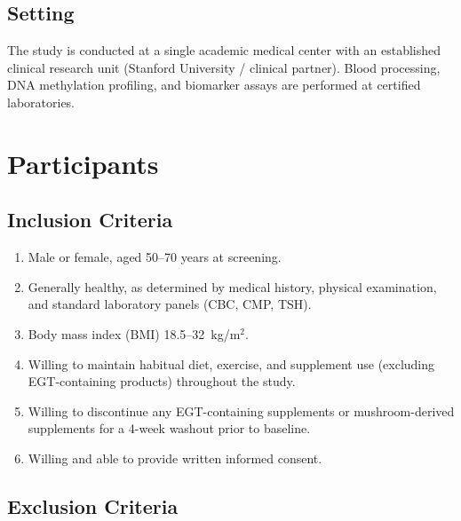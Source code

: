 \documentclass[11pt,a4paper]{article}
\begin{document}
\subsection{Setting}

The study is conducted at a single academic medical center with an established clinical research unit (Stanford University / clinical partner). Blood processing, DNA methylation profiling, and biomarker assays are performed at certified laboratories.

\section{Participants}

\subsection{Inclusion Criteria}

\begin{enumerate}[nosep]
  \item Male or female, aged 50--70 years at screening.
  \item Generally healthy, as determined by medical history, physical examination, and standard laboratory panels (CBC, CMP, TSH).
  \item Body mass index (BMI) 18.5--32~kg/m$^2$.
  \item Willing to maintain habitual diet, exercise, and supplement use (excluding EGT-containing products) throughout the study.
  \item Willing to discontinue any EGT-containing supplements or mushroom-derived supplements for a 4-week washout prior to baseline.
  \item Willing and able to provide written informed consent.
\end{enumerate}

\subsection{Exclusion Criteria}
\end{document}

